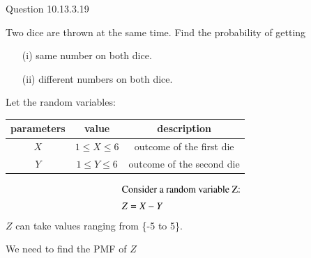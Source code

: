 \documentclass[journal,12pt,twocolumn]{IEEEtran}
\theoremstyle{remark}
\begin{document}
Question 10.13.3.19

Two dice are thrown at the same time. Find the probability of getting
\begin{enumerate}
    \item[(i)] same number on both dice.
    \item[(ii)] different numbers on both dice.
\end{enumerate}
\solution
Let the random variables:
\begin{table}[!ht]
\begin{tabular}{|c|c|c|}
	\hline
	\textbf{parameters} & \textbf{value} & \textbf{description}\\
	\hline
	$X$ & $1 \leq X \leq 6$ & outcome of the first die \\
	\hline
	$Y$ & $1\leq Y \leq 6$ & outcome of the second die\\
	\hline
\end{tabular}
\end{table}
\begin{align}
\intertext{Consider a random variable Z:}
Z &= X-Y
\end{align}
$Z$ can take values ranging from \{-5 to 5\}.

We need to find the PMF of $Z$
\end{document}
